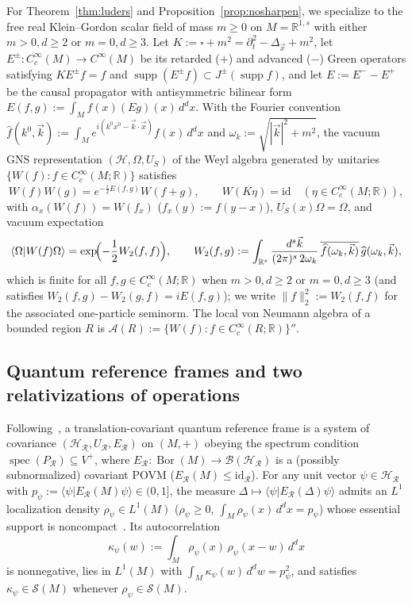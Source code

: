 \documentclass[11pt,a4paper]{article}
\theoremstyle{definition}
\theoremstyle{remark}
\newcommand{\HH}{\mathcal{H}}
\newcommand{\BB}{\mathcal{B}}
\newcommand{\Ac}{\mathcal{A}}
\newcommand{\Rf}{\mathscr{R}}
\newcommand{\RR}{\mathbb{R}}
\newcommand{\id}{\mathrm{id}}
\newcommand{\supp}{\operatorname{supp}}
\newcommand{\braket}[2]{\langle #1 | #2 \rangle}
\newcommand{\norm}[1]{\|#1\|}
\begin{document}
For Theorem~\ref{thm:luders} and Proposition~\ref{prop:nosharpen}, we specialize to the free real Klein--Gordon scalar field of mass $m\ge 0$ on $M = \RR^{1,s}$ with either $m>0, d\ge 2$ or $m=0, d\ge 3$. Let $K := \square + m^2 = \partial_t^2 - \Delta_{\vec{x}} + m^2$, let $E^\pm : C_c^\infty(M)\to C^\infty(M)$ be its retarded ($+$) and advanced ($-$) Green operators satisfying $K E^\pm f = f$ and $\supp(E^\pm f)\subset J^\pm(\supp f)$, and let $E := E^- - E^+$ be the causal propagator with antisymmetric bilinear form $E(f,g) := \int_M f(x)(Eg)(x)\,d^dx$. With the Fourier convention $\widehat{f}(k^0,\vec{k}) := \int_M e^{i(k^0 x^0 - \vec{k}\cdot\vec{x})} f(x)\,d^dx$ and $\omega_k := \sqrt{|\vec{k}|^2 + m^2}$, the vacuum GNS representation $(\HH,\Omega,U_S)$ of the Weyl algebra generated by unitaries $\{W(f) : f\in C_c^\infty(M;\RR)\}$ satisfies
\begin{equation}\label{eq:weyl}
W(f)W(g) = e^{-\frac{i}{2}E(f,g)} W(f+g), \qquad W(K\eta) = \id \quad (\eta\in C_c^\infty(M;\RR)),
\end{equation}
with $\alpha_x(W(f)) = W(f_x)$ ($f_x(y):=f(y-x)$), $U_S(x)\Omega = \Omega$, and vacuum expectation
\begin{equation}\label{eq:vac}
\braket{\Omega}{W(f)\Omega} = \exp\!\Bigl(-\frac{1}{2}W_2(f,f)\Bigr), \qquad
W_2(f,g) := \int_{\RR^s} \frac{d^s\vec{k}}{(2\pi)^s\,2\omega_k}\,\overline{\widehat{f}(\omega_k,\vec{k})}\,\widehat{g}(\omega_k,\vec{k}),
\end{equation}
which is finite for all $f,g\in C_c^\infty(M;\RR)$ when $m>0, d\ge 2$ or $m=0, d\ge 3$ (and satisfies $W_2(f,g)-W_2(g,f)=i E(f,g)$); we write $\norm{f}_2^2 := W_2(f,f)$ for the associated one-particle seminorm. The local von Neumann algebra of a bounded region $R$ is $\Ac(R) := \{W(f) : f\in C_c^\infty(R;\RR)\}''$.

\subsection{Quantum reference frames and two relativizations of operations}
Following~\cite{FewsterLoveridge2026}, a translation-covariant quantum reference frame is a system of covariance $(\HH_\Rf, U_\Rf, E_\Rf)$ on $(M,+)$ obeying the spectrum condition $\operatorname{spec}(P_\Rf)\subseteq \overline{V^+}$, where $E_\Rf:\operatorname{Bor}(M)\to\BB(\HH_\Rf)$ is a (possibly subnormalized) covariant POVM ($E_\Rf(M)\le\id_\Rf$). For any unit vector $\psi\in\HH_\Rf$ with $p_\psi := \braket{\psi}{E_\Rf(M)\psi}\in (0,1]$, the measure $\Delta\mapsto\braket{\psi}{E_\Rf(\Delta)\psi}$ admits an $L^1$ localization density $\rho_\psi\in L^1(M)$ ($\rho_\psi\ge 0$, $\int_M \rho_\psi(x)\,d^dx = p_\psi$) whose essential support is noncompact~\cite[Lem.~3.1]{FewsterLoveridge2026}. Its autocorrelation
\begin{equation}\label{eq:autocorr}
\kappa_\psi(w) := \int_M \rho_\psi(x)\,\rho_\psi(x - w)\,d^dx
\end{equation}
is nonnegative, lies in $L^1(M)$ with $\int_M \kappa_\psi(w)\,d^dw = p_\psi^2$, and satisfies $\kappa_\psi\in\mathcal{S}(M)$ whenever $\rho_\psi\in\mathcal{S}(M)$.
\end{document}
